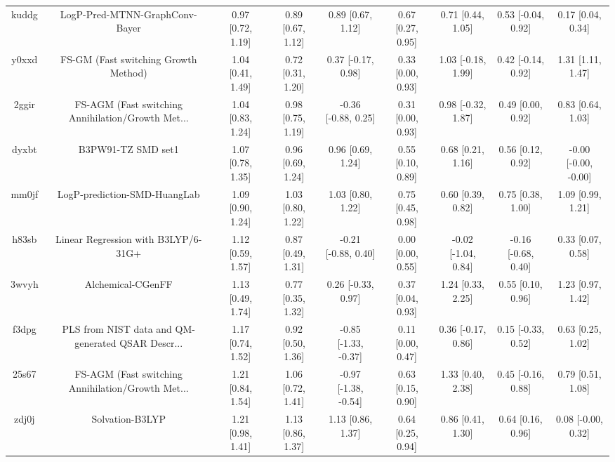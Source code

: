 \documentclass{article}
\begin{document}
\begin{center}
\begin{longtable}{|ccccccccc|}
 kuddg &                     LogP-Pred-MTNN-GraphConv-Bayer &  0.97 [0.72, 1.19] &  0.89 [0.67, 1.12] &     0.89 [0.67, 1.12] &  0.67 [0.27, 0.95] &    0.71 [0.44, 1.05] &   0.53 [-0.04, 0.92] &     0.17 [0.04, 0.34] \\
 y0xxd &               FS-GM (Fast switching Growth Method) &  1.04 [0.41, 1.49] &  0.72 [0.31, 1.20] &    0.37 [-0.17, 0.98] &  0.33 [0.00, 0.93] &   1.03 [-0.18, 1.99] &   0.42 [-0.14, 0.92] &     1.31 [1.11, 1.47] \\
 2ggir &  FS-AGM (Fast switching Annihilation/Growth Met... &  1.04 [0.83, 1.24] &  0.98 [0.75, 1.19] &   -0.36 [-0.88, 0.25] &  0.31 [0.00, 0.93] &   0.98 [-0.32, 1.87] &    0.49 [0.00, 0.92] &     0.83 [0.64, 1.03] \\
 dyxbt &                                 B3PW91-TZ SMD set1 &  1.07 [0.78, 1.35] &  0.96 [0.69, 1.24] &     0.96 [0.69, 1.24] &  0.55 [0.10, 0.89] &    0.68 [0.21, 1.16] &    0.56 [0.12, 0.92] &  -0.00 [-0.00, -0.00] \\
 mm0jf &                       LogP-prediction-SMD-HuangLab &  1.09 [0.90, 1.24] &  1.03 [0.80, 1.22] &     1.03 [0.80, 1.22] &  0.75 [0.45, 0.98] &    0.60 [0.39, 0.82] &    0.75 [0.38, 1.00] &     1.09 [0.99, 1.21] \\
 h83sb &                Linear Regression with B3LYP/6-31G+ &  1.12 [0.59, 1.57] &  0.87 [0.49, 1.31] &   -0.21 [-0.88, 0.40] &  0.00 [0.00, 0.55] &  -0.02 [-1.04, 0.84] &  -0.16 [-0.68, 0.40] &     0.33 [0.07, 0.58] \\
 3wvyh &                                  Alchemical-CGenFF &  1.13 [0.49, 1.74] &  0.77 [0.35, 1.32] &    0.26 [-0.33, 0.97] &  0.37 [0.04, 0.93] &    1.24 [0.33, 2.25] &    0.55 [0.10, 0.96] &     1.23 [0.97, 1.42] \\
 f3dpg &  PLS from NIST data and QM-generated QSAR Descr... &  1.17 [0.74, 1.52] &  0.92 [0.50, 1.36] &  -0.85 [-1.33, -0.37] &  0.11 [0.00, 0.47] &   0.36 [-0.17, 0.86] &   0.15 [-0.33, 0.52] &     0.63 [0.25, 1.02] \\
 25s67 &  FS-AGM (Fast switching Annihilation/Growth Met... &  1.21 [0.84, 1.54] &  1.06 [0.72, 1.41] &  -0.97 [-1.38, -0.54] &  0.63 [0.15, 0.90] &    1.33 [0.40, 2.38] &   0.45 [-0.16, 0.88] &     0.79 [0.51, 1.08] \\
 zdj0j &                                    Solvation-B3LYP &  1.21 [0.98, 1.41] &  1.13 [0.86, 1.37] &     1.13 [0.86, 1.37] &  0.64 [0.25, 0.94] &    0.86 [0.41, 1.30] &    0.64 [0.16, 0.96] &    0.08 [-0.00, 0.32] \\

\end{longtable}
\end{center}
\end{document}
